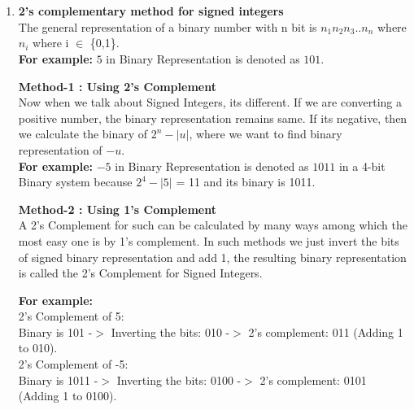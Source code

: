 \documentclass[12pt]{article}
\begin{document}
\maketitle

\section{}

\begin{enumerate}[label=(\alph*)]
    \item \textbf{2’s complementary method for signed integers} \\
    The general representation of a binary number with n bit is $n_1n_2n_3..n_n$ where $n_i$ where i $\in$ \{0,1\}. \\
    \textbf{For example:} $5$ in Binary Representation is denoted as $101$.
    
\textbf{Method-1 : Using 2's Complement} \\
    Now when we talk about Signed Integers, its different. If we are converting a positive number, the binary representation remains same. If its negative, then we calculate the binary of $2^{n} - |u|$, where we want to find binary representation of $-u$. \\
    \textbf{For example:} $-5$ in Binary Representation is denoted as $1011$ in a 4-bit Binary system because $2^{4} - |5|$ = 11 and its binary is 1011. 
    
\textbf{Method-2 : Using 1's Complement} \\    
    A 2's Complement for such can be calculated by many ways among which the most easy one is by 1's complement. In such methods we just invert the bits of signed binary representation and add 1, the resulting binary representation is called the 2's Complement for Signed Integers.
    
    \textbf{For example:}\\
            2's Complement of 5: \\
            Binary is 101 -$>$ Inverting the bits: 010 -$>$ 2's complement: 011 (Adding 1 to 010). \\
            2's Complement of -5:  \\
            Binary is 1011 -$>$ Inverting the bits: 0100 -$>$ 2's complement: 0101 (Adding 1 to 0100).
    

\end{enumerate}
\end{document}
